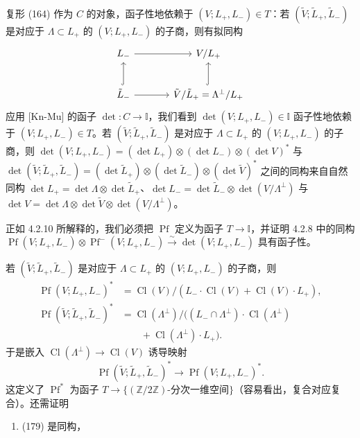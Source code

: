 复形 (164) 作为 $C$ 的对象，函子性地依赖于 $(V;L_{+},L_{-})\in T$：若 $(\tilde{V};\tilde{L}_{+},\tilde{L}_{-})$ 是对应于 $\Lambda\subset L_{+}$ 的 $(V;L_{+},L_{-})$ 的子商，则有拟同构
\[
\begin{tikzcd}[column sep=3.6em, row sep=2.4em]
  L_{-} \arrow[r] & V/L_{+} \\
  \tilde{L}_{-} \arrow[r] \arrow[u, hook] & \tilde{V}/\tilde{L}_{+}=\Lambda^{\perp}/L_{+} \arrow[u, hook]
\end{tikzcd}
\]
应用 [Kn-Mu] 的函子 $\det:C\to\mathbb{I}$，我们看到 $\det(V;L_{+},L_{-})\in\mathbb{I}$ 函子性地依赖于 $(V;L_{+},L_{-})\in T$。若 $(\tilde{V};\tilde{L}_{+},\tilde{L}_{-})$ 是对应于 $\Lambda\subset L_{+}$ 的 $(V;L_{+},L_{-})$ 的子商，则 $\det(V;L_{+},L_{-})=(\det L_{+})\otimes(\det L_{-})\otimes(\det V)^{*}$ 与 $\det(\tilde{V};\tilde{L}_{+},\tilde{L}_{-})=(\det\tilde{L}_{+})\otimes(\det\tilde{L}_{-})\otimes(\det\tilde{V})^{*}$ 之间的同构来自自然同构 $\det L_{+}=\det\Lambda\otimes\det\tilde{L}_{+}$、$\det L_{-}=\det\tilde{L}_{-}\otimes\det(V/\Lambda^{\perp})$ 与 $\det V=\det\Lambda\otimes\det\tilde{V}\otimes\det(V/\Lambda^{\perp})$。

正如 4.2.10 所解释的，我们必须把 $\operatorname{Pf}$ 定义为函子 $T\to\mathbb{I}$，并证明 4.2.8 中的同构 $\operatorname{Pf}(V;L_{+},L_{-})\otimes\operatorname{Pf}^{-}(V;L_{+},L_{-})\xrightarrow{\ \sim\ }\det(V;L_{+},L_{-})$ 具有函子性。

若 $(\tilde{V};\tilde{L}_{+},\tilde{L}_{-})$ 是对应于 $\Lambda\subset L_{+}$ 的 $(V;L_{+},L_{-})$ 的子商，则
\[
\begin{aligned}
\operatorname{Pf}(V;L_{+},L_{-})^{*}&=\operatorname{Cl}(V)/(L_{-}\cdot\operatorname{Cl}(V)+\operatorname{Cl}(V)\cdot L_{+}),\\
\operatorname{Pf}(\tilde{V};\tilde{L}_{+},\tilde{L}_{-})^{*}
&=\operatorname{Cl}(\Lambda^{\perp})/\bigl((L_{-}\cap\Lambda^{\perp})\cdot\operatorname{Cl}(\Lambda^{\perp})\\
&\qquad+\operatorname{Cl}(\Lambda^{\perp})\cdot L_{+}\bigr).
\end{aligned}
\]
于是嵌入 $\operatorname{Cl}(\Lambda^{\perp})\to\operatorname{Cl}(V)$ 诱导映射
\begin{equation}\tag{179}
\operatorname{Pf}(\tilde{V};\tilde{L}_{+},\tilde{L}_{-})^{*}\to\operatorname{Pf}(V;L_{+},L_{-})^{*}.
\end{equation}
这定义了 $\operatorname{Pf}^{*}$ 为函子 $T\to\{(\mathbb{Z}/2\mathbb{Z})\text{-分次一维空间}\}$（容易看出，复合对应复合）。还需证明
\begin{enumerate}[label=\alph*),leftmargin=2.2em]
\item (179) 是同构，
\end{enumerate}

